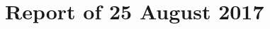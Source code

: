 \documentclass[aspectratio=169, xcolor=table]{beamer}
\begin{document}






\part{Report of 25 August 2017}
\end{document}
